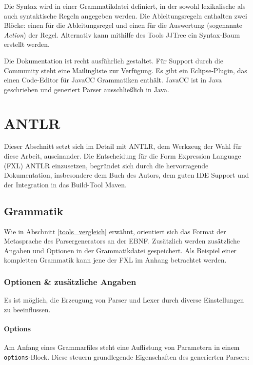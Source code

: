 Die Syntax wird in einer Grammatikdatei definiert, in der sowohl lexikalische als auch syntaktische Regeln angegeben werden. Die Ableitungsregeln enthalten zwei Blöcke: einen für die Ableitungsregel und einen für die Auswertung (sogenannte \emph{Action}) der Regel. Alternativ kann mithilfe des Tools JJTree ein Syntax-Baum erstellt werden.

Die Dokumentation ist recht ausführlich gestaltet. Für Support durch die Community steht eine Mailingliste zur Verfügung. Es gibt ein Eclipse-Plugin, das einen Code-Editor für JavaCC Grammatiken enthält. JavaCC ist in Java geschrieben und generiert Parser ausschließlich in Java.





\section{ANTLR}
\label{tools_antlr}
Dieser Abschnitt setzt sich im Detail mit ANTLR, dem Werkzeug der Wahl für diese Arbeit, auseinander. Die Entscheidung für die Form Expression Language (FXL) ANTLR einzusetzen, begründet sich durch die hervorragende Dokumentation, insbesondere dem Buch des Autors, dem guten IDE Support und der Integration in das Build-Tool Maven.


\subsection{Grammatik}

Wie in Abschnitt \ref{tools_vergleich} erwähnt, orientiert sich das Format der Metasprache des Parsergenerators an der EBNF. Zusätzlich werden zusätzliche Angaben und Optionen in der Grammatikdatei gespeichert. Als Beispiel einer kompletten Grammatik kann jene der FXL im Anhang betrachtet werden.

\subsubsection{Optionen \& zusätzliche Angaben}

Es ist möglich, die Erzeugung von Parser und Lexer durch diverse Einstellungen zu beeinflussen.

\paragraph{Options}

Am Anfang eines Grammarfiles steht eine Auflistung von Parametern in einem \texttt{options}-Block. Diese steuern grundlegende Eigenschaften des generierten Parsers:

